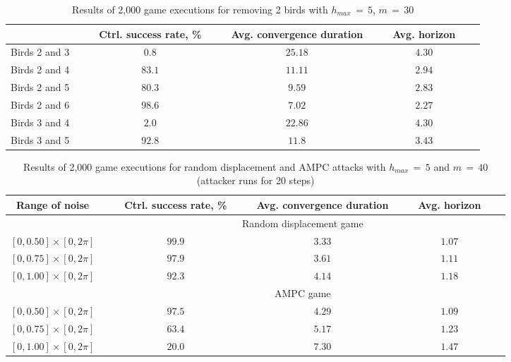 \begin{table}[ht]
	\centering
	\caption{Results of 2,000 game executions for removing 2 birds with $h_{\mathit{max}} \,{=}\,5$, $m\,{=}\,30$}
	\begin{tabular}{lccccccccccc}
		\toprule
		&&& Ctrl. success rate, \% &&& Avg. convergence duration &&& Avg. horizon\\
      	\midrule
        Birds 2 and 3 & & &$0.8$ & & &$25.18$&&&$4.30$\\
        Birds 2 and 4 & & &$83.1$ & & &$11.11$ &&&$2.94$\\
        Birds 2 and 5 & & &$80.3$ & & &$9.59$ &&&$2.83$\\
        Birds 2 and 6 & & &$98.6$ & & &$7.02$ &&&$2.27$\\
        Birds 3 and 4 & & &$2.0$ & & &$22.86$ &&&$4.30$\\
        Birds 3 and 5 & & &$92.8$ & & &$11.8$ &&&$3.43$\\
		\bottomrule
\end{tabular}
\label{tab:resRemoveTwo}
\end{table}

\begin{table}[t]
	\centering
	\caption{Results of 2,000 game executions for random displacement and AMPC attacks with $h_{\mathit{max}}\,{=}\,5$ and $m\,{=}\,40$ (attacker runs for 20 steps)}
	\begin{tabular}{cccccccccccc}  
		\toprule
		Range of noise &&& Ctrl. success rate, \% &&& Avg. convergence duration &&& Avg. horizon\\
      	\midrule
        &&&\multicolumn{7}{c}{Random displacement game}\\
        \cmidrule(l){3-10}
        $[0,0.50]\times[0,2\pi]$ & & &$99.9$ & & &$3.33$ &&&$1.07$\\
        $[0,0.75]\times[0,2\pi]$ & & &$97.9$ & & &$3.61$ &&&$1.11$\\
        $[0,1.00]\times[0,2\pi]$ & & &$92.3$ & & &$4.14$ &&&$1.18$\\
 		\cmidrule(l){3-10}
        &&&\multicolumn{7}{c}{AMPC game}\\
        \cmidrule(l){3-10}
        $[0,0.50]\times[0,2\pi]$  && & $97.5$    &&& $4.29$ &&& $1.09$\\
        $[0,0.75]\times[0,2\pi]$  && & $63.4$    &&& $5.17$ &&& $1.23$\\
        $[0,1.00]\times[0,2\pi]$  && & $20.0$    &&& $7.30$ &&& $1.47$\\
		\bottomrule
\end{tabular}
\label{tab:resRandomNoise}
\end{table}

